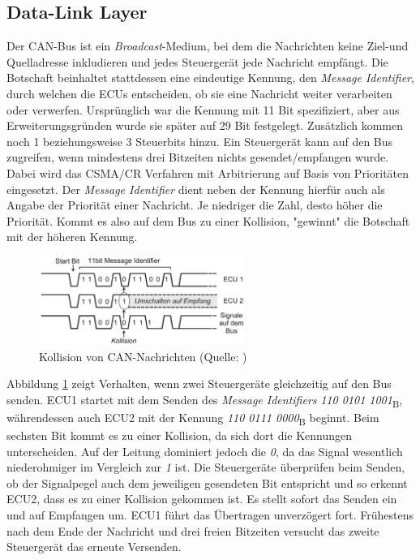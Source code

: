 \subsection{Data-Link Layer}

Der CAN-Bus ist ein \textit{Broadcast}-Medium, bei dem die Nachrichten keine Ziel-und Quelladresse inkludieren und jedes Steuergerät jede Nachricht empfängt. Die Botschaft beinhaltet stattdessen eine eindeutige Kennung, den \textit{Message Identifier}, durch welchen die ECUs entscheiden, ob sie eine Nachricht weiter verarbeiten oder verwerfen. Ursprünglich war die Kennung mit 11 Bit spezifiziert, aber aus Erweiterungsgründen wurde sie später auf 29 Bit festgelegt. Zusätzlich kommen noch 1 beziehungsweise 3 Steuerbits hinzu. Ein Steuergerät kann auf den Bus zugreifen, wenn mindestens drei Bitzeiten nichts gesendet/empfangen wurde. Dabei wird das CSMA/CR Verfahren mit Arbitrierung auf Basis von Prioritäten eingesetzt. Der \textit{Message Identifier} dient neben der Kennung hierfür auch als Angabe der Priorität einer Nachricht. Je niedriger die Zahl, desto höher die Priorität. Kommt es also auf dem Bus zu einer Kollision, "gewinnt" die Botschaft mit der höheren Kennung.

\begin{figure}[htbp]
	\centering
		\includegraphics[width=0.6\textwidth]{images/can_csma_cr.png}
	\caption{Kollision von CAN-Nachrichten (Quelle: \cite{Zimmermann2014})}
	\label{fig:can_csma_cr}
\end{figure}

Abbildung \ref{fig:can_csma_cr} zeigt Verhalten, wenn zwei Steuergeräte gleichzeitig auf den Bus senden. ECU1 startet mit dem Senden des \textit{Message Identifiers} \textit{110 0101 1001}\textsubscript{B}, währendessen auch ECU2 mit der Kennung \textit{110 0111 0000}\textsubscript{B} beginnt. Beim sechsten Bit kommt es zu einer Kollision, da sich dort die Kennungen unterscheiden. Auf der Leitung dominiert jedoch die \textit{0}, da das Signal wesentlich niederohmiger im Vergleich zur \textit{1} ist. Die Steuergeräte überprüfen beim Senden, ob der Signalpegel auch dem jeweiligen gesendeten Bit entspricht und so erkennt ECU2, dass es zu einer Kollision gekommen ist. Es stellt sofort das Senden ein und auf Empfangen um. ECU1 führt das Übertragen unverzögert fort. Frühestens nach dem Ende der Nachricht und drei freien Bitzeiten versucht das zweite Steuergerät das erneute Versenden.


